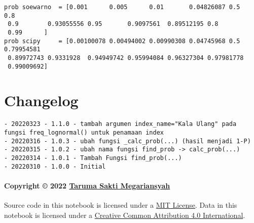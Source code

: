 \documentclass[11pt]{article}
\begin{document}
    \begin{Verbatim}[commandchars=\\\{\}]
prob soewarno  = [0.001      0.005      0.01       0.04826087 0.5        0.8
 0.9        0.93055556 0.95       0.9097561  0.89512195 0.8
 0.99      ]
prob scipy     = [0.00100078 0.00494002 0.00990308 0.04745968 0.5
0.79954581
 0.89972743 0.9331928  0.94949742 0.95994084 0.96327304 0.97981778
 0.99009692]
    \end{Verbatim}

    \hypertarget{changelog}{%
\section{Changelog}\label{changelog}}

\begin{verbatim}
- 20220323 - 1.1.0 - tambah argumen index_name="Kala Ulang" pada fungsi freq_lognormal() untuk penamaan index
- 20220316 - 1.0.3 - ubah fungsi _calc_prob(...) (hasil menjadi 1-P)
- 20220315 - 1.0.2 - ubah nama fungsi find_prob -> calc_prob(...)
- 20220314 - 1.0.1 - Tambah Fungsi find_prob(...)
- 20220310 - 1.0.0 - Initial
\end{verbatim}

\hypertarget{copyright-2022-taruma-sakti-megariansyah}{%
\paragraph{\texorpdfstring{Copyright © 2022
\href{https://taruma.github.io}{Taruma Sakti
Megariansyah}}{Copyright © 2022 Taruma Sakti Megariansyah}}\label{copyright-2022-taruma-sakti-megariansyah}}

Source code in this notebook is licensed under a
\href{https://choosealicense.com/licenses/mit/}{MIT License}. Data in
this notebook is licensed under a
\href{https://creativecommons.org/licenses/by/4.0/}{Creative Common
Attribution 4.0 International}.


    
    
    
\end{document}
